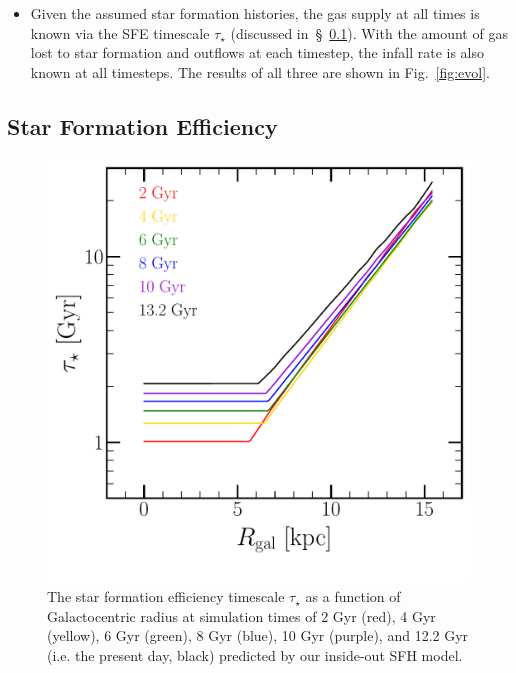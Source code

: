 \documentclass[fleqn, usenatbib]{mnras}
\begin{document}
\begin{itemize}
	\item Given the assumed star formation histories, the gas supply at all 
	times is known via the SFE timescale $\tau_\star$ (discussed 
	in~\S~\ref{sec:methods:sfe}). With the amount of gas lost to star formation 
	and outflows at each timestep, the infall rate is also known at all 
	timesteps. The results of all three are shown in Fig.~\ref{fig:evol}. 
\end{itemize} 

\subsection{Star Formation Efficiency} 
\label{sec:methods:sfe} 

\begin{figure} 
\centering 
\includegraphics[scale = 0.45]{sfe.pdf} 
\caption{The star formation efficiency timescale $\tau_\star$ as a 
function of Galactocentric radius at simulation times of 2 Gyr (red), 4 Gyr 
(yellow), 6 Gyr (green), 8 Gyr (blue), 10 Gyr (purple), and 12.2 Gyr (i.e. 
the present day, black) predicted by our inside-out SFH model. }
\label{fig:sfe} 
\end{figure} 
\end{document}
